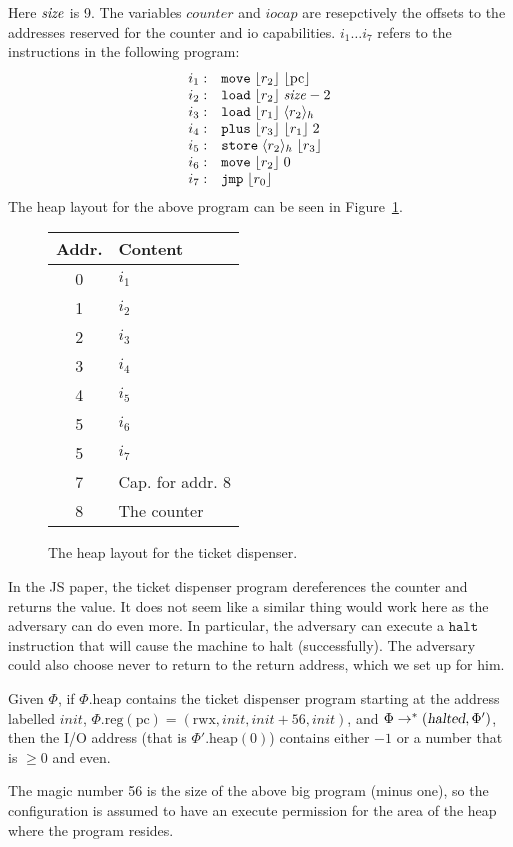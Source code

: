 \documentclass{article}
\newcommand{\pcreg}{\mathrm{pc}}
\newcommand{\plainproj}[1]{\mathrm{#1}}
\newcommand{\memheap}[1][\Phi]{#1.\plainproj{heap}}
\newcommand{\memreg}[1][\Phi]{#1.\plainproj{reg}}
\newcommand{\halted}{\textsl{halted}}
\newcommand{\codelabel}[1]{\mathit{#1}}
\newcommand{\init}{\codelabel{init}}
\newcommand{\counter}{\codelabel{counter}}
\newcommand{\iocap}{\codelabel{iocap}}
\newcommand{\refreg}[1]{\lfloor #1 \rfloor}
\newcommand{\refheap}[1]{\langle #1 \rangle_h}
\newcommand{\halt}{\instr{halt}}
\newcommand{\instr}[1]{\mathtt{#1}}
\newcommand{\oneinstr}[2]{\instr{#1} \; #2}
\newcommand{\jmp}[1]{\oneinstr{jmp}{#1}}
\newcommand{\twoinstr}[3]{\instr{#1} \; #2 \; #3}
\newcommand{\move}[2]{\twoinstr{move}{#1}{#2}}
\newcommand{\store}[2]{\twoinstr{store}{#1}{#2}}
\newcommand{\load}[2]{\twoinstr{load}{#1}{#2}}
\newcommand{\threeinstr}[4]{\instr{#1} \; #2 \; #3 \; #4}
\newcommand{\plus}[3]{\threeinstr{plus}{#1}{#2}{#3}}
\newcommand{\plainperm}[1]{\mathrm{#1}}
\newcommand{\rwx}{\plainperm{rwx}}
\begin{document}
Here $\mathit{size}$ is 9. The variables $\counter$ and $\iocap$ are resepctively the offsets to the addresses reserved for the counter and io capabilities. $i_1 \dots i_7$ refers to the instructions in the following program:
\[
  \begin{array}{r l}
    i_1 :& \move{\refreg{r_2}}{\refreg{\pcreg}} \\
    i_2 :& \load{\refreg{r_2}}{\size - 2} \\
    i_3 :& \load{\refreg{r_1}}{\refheap{r_2}}\\
    i_4 :& \plus{\refreg{r_3}}{\refreg{r_1}}{2} \\
    i_5 :& \store{\refheap{r_2}}{\refreg{r_3}} \\
    i_6 :& \move{\refreg{r_2}}{0} \\
    i_7 :& \jmp{\refreg{r_0}}
  \end{array}
\]
The heap layout for the above program can be seen in Figure~\ref{tab:tick-disp-heap}.
\begin{figure}[ht]
  \centering
  \begin{tabular}{ | c | l | }
    \hline
    Addr. & Content \\ \hline
    0   &  $i_1$ \\ \hline
    1   &  $i_2$ \\ \hline
    2   &  $i_3$ \\ \hline
    3   &  $i_4$ \\ \hline
    4   &  $i_5$ \\ \hline
    5   &  $i_6$ \\ \hline
    5   &  $i_7$ \\ \hline
    7   & Cap. for addr. 8 \\ \hline
    8   & The counter \\ \hline  
  \end{tabular}
  \caption{The heap layout for the ticket dispenser.}
  \label{tab:tick-disp-heap}
\end{figure}
In the JS paper, the ticket dispenser program dereferences the counter and returns the value. It does not seem like a similar thing would work here as the adversary can do even more. In particular, the adversary can execute a $\halt$ instruction that will cause the machine to halt (successfully). The adversary could also choose never to return to the return address, which we set up for him.
\begin{lemma}
 Given $\Phi$, if $\memheap$ contains the ticket dispenser program starting at the address labelled $\init$, $\memreg(\pcreg) = (\rwx,\init,\init+56,\init)$, and $\Phi \rightarrow^* (\halted,\Phi')$, then the I/O address (that is $\memheap[\Phi'](0)$) contains either $-1$ or a number that is $\geq 0$ and even.
\end{lemma}
The magic number 56 is the size of the above big program (minus one), so the configuration is assumed to have an execute permission for the area of the heap where the program resides.
\end{document}
